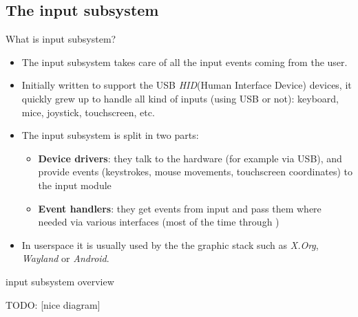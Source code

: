 \subsection{The input subsystem}

\begin{frame}{What is input subsystem?}
  \begin{itemize}
  \item The input subsystem takes care of all the input events coming
    from the user.
  \item Initially written to support the USB {\em HID}(Human Interface
    Device) devices, it quickly grew up to handle all kind of inputs
    (using USB or not): keyboard, mice, joystick, touchscreen, etc.
  \item The input subsystem is split in two parts:
    \begin{itemize}
    \item {\bf Device drivers}: they talk to the hardware (for example
      via USB), and provide events (keystrokes, mouse movements,
      touchscreen coordinates) to the input module
    \item {\bf Event handlers}: they get events from input and pass them
      where needed via various interfaces (most of the time through
      )
    \end{itemize}
  \item In userspace it is usually used by the the graphic stack such
    as {\em X.Org}, {\em Wayland} or {\em Android}.
  \end{itemize}
\end{frame}

\begin{frame}{input subsystem overview}

TODO: [nice diagram]

\end{frame}

